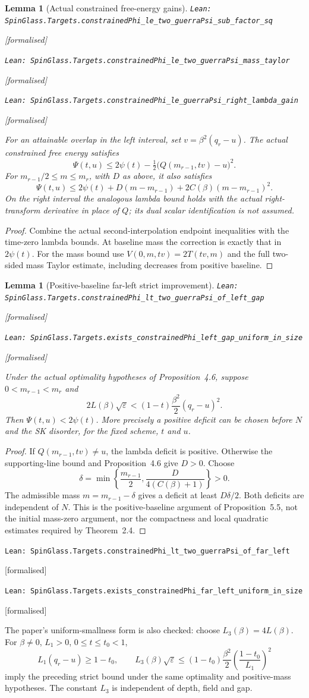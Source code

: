 \documentclass[11pt]{article}
\providecommand{\lean}[1]{\leavevmode\par\nopagebreak
  {\noindent\normalfont\footnotesize\raggedright\texttt{Lean: #1}\par}\nopagebreak}
\providecommand{\leanok}{\par\nopagebreak
  {\noindent\normalfont\footnotesize\textcolor{green!50!black}{[formalised]}\par}\nopagebreak}
\newtheorem{lemma}[theorem]{Lemma}
\begin{document}
\begin{lemma}[Actual constrained free-energy gains]
\lean{SpinGlass.Targets.constrainedPhi\_le\_two\_guerraPsi\_sub\_factor\_sq}\leanok
\lean{SpinGlass.Targets.constrainedPhi\_le\_two\_guerraPsi\_mass\_taylor}\leanok
\lean{SpinGlass.Targets.constrainedPhi\_le\_guerraPsi\_right\_lambda\_gain}\leanok
For an attainable overlap in the left interval, set $v=\beta^2(q_r-u)$.
The actual constrained free energy satisfies
\[
 \Psi(t,u)\le2\psi(t)-\tfrac12\bigl(Q(m_{r-1},tv)-u\bigr)^2.
\]
For $m_{r-1}/2\le m\le m_r$, with $D$ as above, it also satisfies
\[
 \Psi(t,u)\le2\psi(t)+D(m-m_{r-1})+2C(\beta)(m-m_{r-1})^2.
\]
On the right interval the analogous lambda bound holds with the actual
right-transform derivative in place of $Q$; its dual scalar identification
is not assumed.
\end{lemma}
\begin{proof}
Combine the actual second-interpolation endpoint inequalities with the
time-zero lambda bounds. At baseline mass the correction is exactly that
in $2\psi(t)$. For the mass bound use $V(0,m,tv)=2T(tv,m)$ and the full
two-sided mass Taylor estimate, including decreases from positive baseline.
\end{proof}

\begin{lemma}[Positive-baseline far-left strict improvement]
\lean{SpinGlass.Targets.constrainedPhi\_lt\_two\_guerraPsi\_of\_left\_gap}\leanok
\lean{SpinGlass.Targets.exists\_constrainedPhi\_left\_gap\_uniform\_in\_size}\leanok
Under the actual optimality hypotheses of Proposition~4.6, suppose
$0<m_{r-1}<m_r$ and
\[
 2L(\beta)\sqrt\varepsilon<(1-t)\frac{\beta^2}2(q_r-u)^2.
\]
Then $\Psi(t,u)<2\psi(t)$. More precisely a positive deficit can be chosen
before $N$ and the SK disorder, for the fixed scheme, $t$ and $u$.
\end{lemma}
\begin{proof}
If $Q(m_{r-1},tv)\ne u$, the lambda deficit is positive. Otherwise the
supporting-line bound and Proposition~4.6 give $D>0$. Choose
\[
 \delta=\min\left\{\frac{m_{r-1}}2,\frac{D}{4(C(\beta)+1)}\right\}>0.
\]
The admissible mass $m=m_{r-1}-\delta$ gives a deficit at least $D\delta/2$.
Both deficits are independent of $N$. This is the positive-baseline
argument of Proposition~5.5, not the initial mass-zero argument, nor the
compactness and local quadratic estimates required by Theorem~2.4.
\end{proof}
\lean{SpinGlass.Targets.constrainedPhi\_lt\_two\_guerraPsi\_of\_far\_left}\leanok
\lean{SpinGlass.Targets.exists\_constrainedPhi\_far\_left\_uniform\_in\_size}\leanok
The paper's uniform-smallness form is also checked: choose
$L_3(\beta)=4L(\beta)$. For $\beta\ne0$, $L_1>0$, $0\le t\le t_0<1$,
\[
 L_1(q_r-u)\ge1-t_0,\qquad
 L_3(\beta)\sqrt\varepsilon\le
 (1-t_0)\frac{\beta^2}2\left(\frac{1-t_0}{L_1}\right)^2
\]
imply the preceding strict bound under the same optimality and positive-mass
hypotheses. The constant $L_3$ is independent of depth, field and gap.
\end{document}

